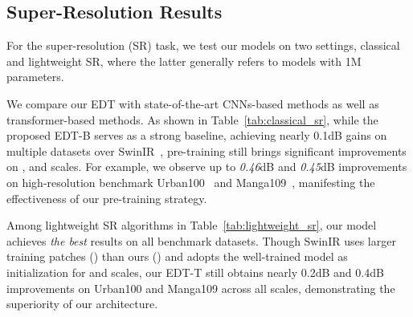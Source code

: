\documentclass[runningheads]{llncs}
\begin{document}
	\vspace{-0.1in}
	\subsection{Super-Resolution Results}
	
	For the super-resolution (SR) task, we test our models on two settings, classical and lightweight SR, where the latter generally refers to models with  1M parameters.
	
	\vspace{0.05in}
	 We compare our EDT with state-of-the-art CNNs-based methods as well as transformer-based methods. As shown in Table~\ref{tab:classical_sr}, while the proposed EDT-B serves as a strong baseline, achieving nearly 0.1dB gains on multiple datasets over SwinIR~\cite{liang2021swinir}, pre-training still brings significant improvements on ,  and  scales. For example, we observe up to \textit{0.46}dB and \textit{0.45}dB improvements on high-resolution benchmark Urban100~\cite{huang2015single} and Manga109~\cite{matsui2017sketch}, manifesting the effectiveness of our pre-training strategy. 
	
	\vspace{0.05in}
	 Among lightweight SR algorithms in Table~\ref{tab:lightweight_sr}, our model achieves \textit{the best} results on all benchmark datasets. Though SwinIR uses larger training patches () than ours () and adopts the well-trained  model as initialization for  and  scales, our EDT-T still obtains nearly 0.2dB and 0.4dB improvements on Urban100 and Manga109 across all scales, demonstrating the superiority of our architecture.
	
	
	
\end{document}
